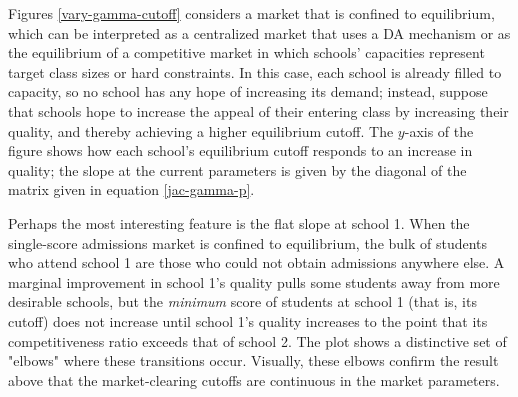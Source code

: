 \documentclass[12pt]{article}
\theoremstyle{definition}
\begin{document}
Figures \ref{vary-gamma-cutoff} considers a market that is confined to equilibrium, which can be interpreted as a centralized market that uses a DA mechanism or as the equilibrium of a competitive market in which schools' capacities represent target class sizes or hard constraints. In this case, each school is already filled to capacity, so no school has any hope of increasing its demand; instead, suppose that schools hope to increase the appeal of their entering class by increasing their quality, and thereby achieving a higher equilibrium cutoff. The $y$-axis of the figure shows how each school's equilibrium cutoff responds to an increase in quality; the slope at the current parameters is given by the diagonal of the matrix given in equation \eqref{jac-gamma-p}.

Perhaps the most interesting feature is the flat slope at school 1. When the single-score admissions market is confined to equilibrium, the bulk of students who attend school 1 are those who could not obtain admissions anywhere else. A marginal improvement in school 1's quality pulls some students away from more desirable schools, but the \emph{minimum} score of students at school 1 (that is, its cutoff) does not increase until school 1's quality increases to the point that its competitiveness ratio exceeds that of school 2. The plot shows a distinctive set of "elbows" where these transitions occur. Visually, these elbows confirm the result above that the market-clearing cutoffs are continuous in the market parameters. 
\end{document}
